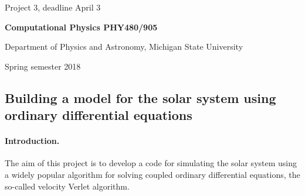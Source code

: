 \documentclass[%
oneside,                 %
final,                   %
10pt]{article}
\begin{document}

\newcommand{\exercisesection}[1]{\subsection*{#1}}






\thispagestyle{empty}

\begin{center}
{\LARGE\bf
\begin{spacing}{1.25}
Project 3, deadline  April 3
\end{spacing}
}
\end{center}


\begin{center}
{\bf Computational Physics PHY480/905}
\end{center}

    \begin{center}
\centerline{{\small Department of Physics and Astronomy, Michigan State University}}
\end{center}
    

\begin{center}
Spring semester 2018
\end{center}

\vspace{1cm}


\subsection*{Building a model for the solar system using ordinary differential equations}

\paragraph{Introduction.}
The aim of this project is to develop a code for simulating the solar system using a widely popular algorithm for solving coupled ordinary differential equations, the so-called velocity Verlet
algorithm.
\end{document}
